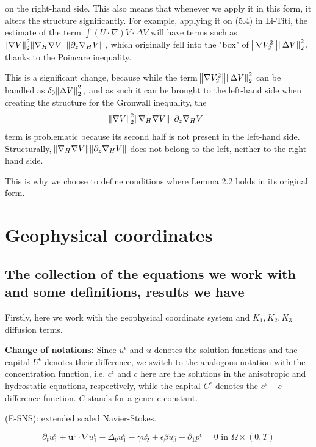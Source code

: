 \documentclass[11pt]{article}
\begin{document}
on the right-hand side. This also means that whenever we apply it in this form, it alters the structure significantly. For example, applying it on (5.4) in Li-Titi, the estimate of the term $\int (U \cdot \nabla) V \cdot \Delta V$ will have terms such as $\norm{\nabla V}_2^2 \norm{\nabla_H \nabla V} \norm{\partial_z \nabla_H V},$ which originally fell into the "box" of $\norm{\nabla V_2^2} \norm{\Delta V}_2^2,$ thanks to the Poincare inequality.

This is a significant change, because while the term $\norm{\nabla V_2^2} \norm{\Delta V}_2^2$ can be handled as $\delta_0 \norm{\Delta V}_2^2,$ and as such it can be brought to the left-hand side when creating the structure for the Gronwall inequality, the $$\norm{\nabla V}_2^2 \norm{\nabla_H \nabla V} \norm{\partial_z \nabla_H V}$$ term is problematic because its second half is not present in the left-hand side. Structurally, $ \norm{\nabla_H \nabla V} \norm{\partial_z \nabla_H V}$ does not belong to the left, neither to the right-hand side.

This is why we choose to define conditions where Lemma 2.2 holds in its original form.

\section{Geophysical coordinates}

\subsection{The collection of the equations we work with and some definitions, results we have}

Firstly, here we work with the geophysical coordinate system and $K_1, K_2, K_3$ diffusion terms.

\textbf{Change of notations:} Since $u^\epsilon$ and $u$ denotes the solution functions and the capital $U^\epsilon$ denotes their difference, we switch to the analogous notation with the concentration function, i.e. $c^\epsilon$ and $c$ here are the solutions in the anisotropic and hydrostatic equations, respectively, while the capital $C^\epsilon$ denotes the $c^\epsilon - c$ difference function. $C$ stands for a generic constant.

(E-SNS): extended scaled Navier-Stokes.

    \begin{equation} \label{ANSC1}
    \partial_t u^\epsilon _1 + \mathbf{u}^\epsilon \cdot \nabla u^\epsilon _1 -\Delta_\nu u^\epsilon _1 -\gamma u_2^\epsilon + \epsilon \beta u_3^\epsilon + \partial_1 p^\epsilon = 0 \text{ in } \Omega \times (0,T)
    \end{equation}
    
\end{document}
